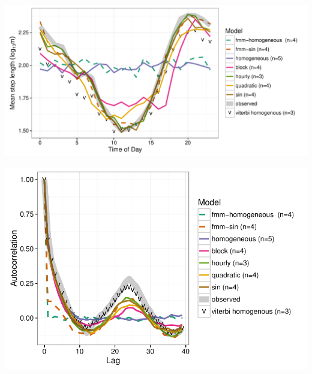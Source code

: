 \documentclass{article}\usepackage[]{graphicx}\usepackage{xcolor}
\makeatletter
\def\maxwidth{ %
  \ifdim\Gin@nat@width>\linewidth
    \linewidth
  \else
    \Gin@nat@width
  \fi
}
\newenvironment{knitrout}{}{} %
\makeatother
\begin{document}
\begin{knitrout}
\color{fgcolor}
\includegraphics[width=\maxwidth]{figure/avg_step_length_by_time2-1} 

\end{knitrout}

\clearpage

\begin{knitrout}
\color{fgcolor}
\includegraphics[width=\maxwidth]{figure/acf_plot2-1} 

\end{knitrout}


\clearpage
\end{document}
